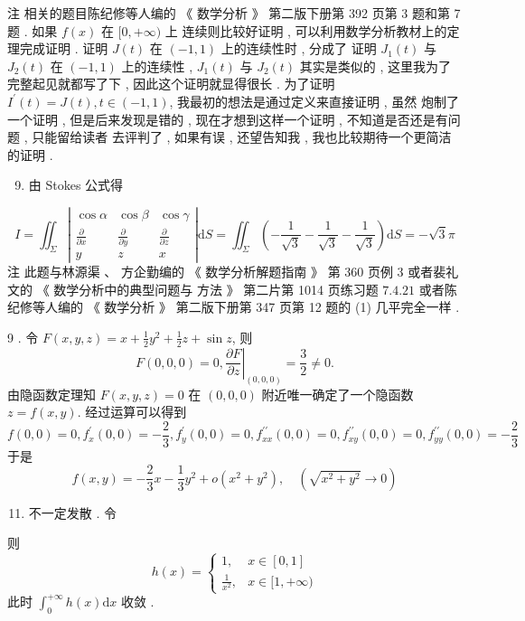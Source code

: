 \documentclass[10pt]{article}
\begin{document}
 注   相关的题目陈纪修等人编的  《 数学分析 》 第二版下册第  392  页第  3  题和第  7  题 .  如果  $f(x)$  在  $[0,+\infty)$  上   连续则比较好证明 ,  可以利用数学分析教材上的定理完成证明 .  证明  $J(t)$  在  $(-1,1)$  上的连续性时 ,  分成了   证明  $J_{1}(t)$  与  $J_{2}(t)$  在  $(-1,1)$  上的连续性 , $J_{1}(t)$  与  $J_{2}(t)$  其实是类似的 ,  这里我为了完整起见就都写了下 ,  因此这个证明就显得很长 .  为了证明  $I^{\prime}(t)=J(t), t \in(-1,1)$,  我最初的想法是通过定义来直接证明 ,  虽然   炮制了一个证明 ,  但是后来发现是错的 ,  现在才想到这样一个证明 ,  不知道是否还是有问题 ,  只能留给读者   去评判了 ,  如果有误 ,  还望告知我 ,  我也比较期待一个更简洁的证明 .

\begin{enumerate}
  \setcounter{enumi}{8}
  \item  由  Stokes  公式得 
\end{enumerate}
$$
I=\iint_{\Sigma}\left|\begin{array}{ccc}
\cos \alpha & \cos \beta & \cos \gamma \\
\frac{\partial}{\partial x} & \frac{\partial}{\partial y} & \frac{\partial}{\partial z} \\
y & z & x
\end{array}\right| \mathrm{d} S=\iint_{\Sigma}\left(-\frac{1}{\sqrt{3}}-\frac{1}{\sqrt{3}}-\frac{1}{\sqrt{3}}\right) \mathrm{d} S=-\sqrt{3} \pi
$$
 注   此题与林源渠 、 方企勤编的 《 数学分析解题指南 》 第  360  页例  3  或者裴礼文的 《 数学分析中的典型问题与   方法 》 第二片第  1014  页练习题  $7.4 .21$  或者陈纪修等人编的 《 数学分析 》 第二版下册第  347  页第  12  题的  (1)  几平完全一样 .

9 .  令  $F(x, y, z)=x+\frac{1}{2} y^{2}+\frac{1}{2} z+\sin z$,  则 
$$
F(0,0,0)=0,\left.\frac{\partial F}{\partial z}\right|_{(0,0,0)}=\frac{3}{2} \neq 0 .
$$
 由隐函数定理知  $F(x, y, z)=0$  在  $(0,0,0)$  附近唯一确定了一个隐函数  $z=f(x, y)$.  经过运算可以得到 
$$
f(0,0)=0, f_{x}^{\prime}(0,0)=-\frac{2}{3}, f_{y}^{\prime}(0,0)=0, f_{x x}^{\prime \prime}(0,0)=0, f_{x y}^{\prime \prime}(0,0)=0, f_{y y}^{\prime \prime}(0,0)=-\frac{2}{3}
$$
 于是 
$$
f(x, y)=-\frac{2}{3} x-\frac{1}{3} y^{2}+o\left(x^{2}+y^{2}\right), \quad\left(\sqrt{x^{2}+y^{2}} \rightarrow 0\right)
$$

\begin{enumerate}
  \setcounter{enumi}{10}
  \item  不一定发散 .  令 
\end{enumerate}
 则 
$$
h(x)= \begin{cases}1, & x \in[0,1] \\ \frac{1}{x^{2}}, & x \in[1,+\infty)\end{cases}
$$
 此时  $\int_{0}^{+\infty} h(x) \mathrm{d} x$  收敛 .
\end{document}
